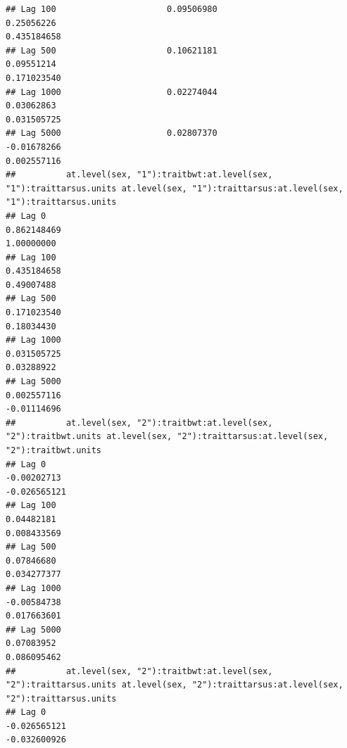 \documentclass[
  12pt,
]{book}
\begin{document}
\begin{verbatim}
## Lag 100                      0.09506980                                                    0.25056226                                                      0.435184658
## Lag 500                      0.10621181                                                    0.09551214                                                      0.171023540
## Lag 1000                     0.02274044                                                    0.03062863                                                      0.031505725
## Lag 5000                     0.02807370                                                   -0.01678266                                                      0.002557116
##          at.level(sex, "1"):traitbwt:at.level(sex, "1"):traittarsus.units at.level(sex, "1"):traittarsus:at.level(sex, "1"):traittarsus.units
## Lag 0                                                         0.862148469                                                          1.00000000
## Lag 100                                                       0.435184658                                                          0.49007488
## Lag 500                                                       0.171023540                                                          0.18034430
## Lag 1000                                                      0.031505725                                                          0.03288922
## Lag 5000                                                      0.002557116                                                         -0.01114696
##          at.level(sex, "2"):traitbwt:at.level(sex, "2"):traitbwt.units at.level(sex, "2"):traittarsus:at.level(sex, "2"):traitbwt.units
## Lag 0                                                      -0.00202713                                                     -0.026565121
## Lag 100                                                     0.04482181                                                      0.008433569
## Lag 500                                                     0.07846680                                                      0.034277377
## Lag 1000                                                   -0.00584738                                                      0.017663601
## Lag 5000                                                    0.07083952                                                      0.086095462
##          at.level(sex, "2"):traitbwt:at.level(sex, "2"):traittarsus.units at.level(sex, "2"):traittarsus:at.level(sex, "2"):traittarsus.units
## Lag 0                                                        -0.026565121                                                        -0.032600926

\end{verbatim}
\end{document}

